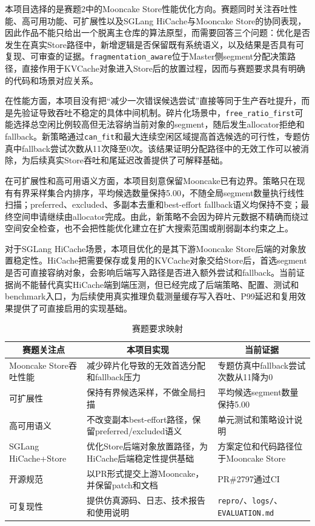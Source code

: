\documentclass[UTF8,zihao=-4,a4paper]{ctexart}
\newcommand{\artifact}[1]{\texttt{#1}}
\newcommand{\strategy}{\texttt{fragmentation\_aware}}
\newcommand{\baseline}{\texttt{free\_ratio\_first}}
\newcommand{\thfirst}[1]{\multicolumn{1}{|c|}{\bfseries #1}}
\newcommand{\thcell}[1]{\multicolumn{1}{c|}{\bfseries #1}}
\begin{document}
本项目选择的是赛题2中的Mooncake Store性能优化方向。赛题同时关注吞吐性能、高可用功能、可扩展性以及SGLang HiCache与Mooncake Store的协同表现，因此作品不能只给出一个脱离主仓库的算法原型，而需要回答三个问题：优化是否发生在真实Store路径中，新增逻辑是否保留既有系统语义，以及结果是否具有可复现、可审查的证据。\strategy{}位于Master侧segment分配决策路径，直接作用于KVCache对象进入Store后的放置过程，因而与赛题要求具有明确的代码和场景对应关系。

在性能方面，本项目没有把“减少一次错误候选尝试”直接等同于生产吞吐提升，而是先验证导致吞吐不稳定的具体中间机制。碎片化场景中，\baseline{}可能选择总空闲比例较高但无法容纳当前对象的segment，随后发生allocator拒绝和fallback。新策略通过\artifact{can\_fit}和最大连续空闲区域提高首选候选的可行性，专题仿真中fallback尝试次数从11次降至0次。该结果证明分配路径中的无效工作可以被消除，为后续真实Store吞吐和尾延迟改善提供了可解释基础。

在可扩展性和高可用语义方面，本项目刻意保留Mooncake已有边界。策略只在现有有界采样集合内排序，平均候选数量保持5.00，不随全局segment数量执行线性扫描；preferred、excluded、多副本去重和best-effort fallback语义均保持不变；最终空间申请继续由allocator完成。由此，新策略不会因为碎片元数据不精确而绕过空间安全检查，也不会把性能优化建立在扩大搜索范围或削弱副本约束之上。

对于SGLang HiCache场景，本项目优化的是其下游Mooncake Store后端的对象放置稳定性。HiCache把需要保存或复用的KVCache对象交给Store后，首选segment是否可直接容纳对象，会影响后端写入路径是否进入额外尝试和fallback。当前证据尚不能替代真实HiCache端到端压测，但已经完成了后端策略、配置、测试和benchmark入口，为后续使用真实推理负载测量缓存写入吞吐、P99延迟和复用效果提供了可直接启用的实现基础。

\begin{longtable}{|B{3.2cm}|L{5.0cm}|L{5.0cm}|}
  \caption{赛题要求映射}\\
  \hline
\thfirst{赛题关注点} & \thcell{本项目实现} & \thcell{当前证据} \\ \hline
  Mooncake Store吞吐性能 & 减少碎片化导致的无效首选分配和fallback压力 & 专题仿真中fallback尝试次数从11降为0 \\ \hline
  可扩展性 & 保持有界候选采样，不做全局扫描 & 平均候选segment数量保持5.00 \\ \hline
  高可用语义 & 不改变副本best-effort路径，保留preferred/excluded语义 & 单元测试和策略设计说明 \\ \hline
  SGLang HiCache+Store & 优化Store后端对象放置路径，为HiCache后端稳定性提供基础 & 方案定位和代码路径位于Mooncake Store \\ \hline
  开源规范 & 以PR形式提交上游Mooncake，并保留patch和文档 & PR\#2797通过CI \\ \hline
  可复现性 & 提供仿真源码、日志、技术报告和使用说明 & \artifact{repro/}、\artifact{logs/}、\artifact{EVALUATION.md} \\ \hline
\end{longtable}
\end{document}
